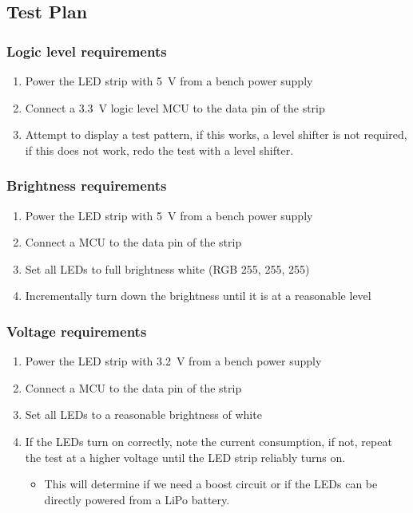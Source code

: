 \documentclass{notes}
\begin{document}
\subsection{Test Plan}
\label{sec:fr1testplan}

\subsubsection{Logic level requirements}
\begin{enumerate}
    \item Power the LED strip with \SI{5}{\volt} from a bench power supply
    \item Connect a \SI{3.3}{\volt} logic level MCU to the data pin of the strip
    \item Attempt to display a test pattern, if this works, a level shifter is not required, if this does not work, redo the test with a level shifter.
\end{enumerate}

\subsubsection{Brightness requirements}
\begin{enumerate}
    \item Power the LED strip with \SI{5}{\volt} from a bench power supply
    \item Connect a MCU to the data pin of the strip
    \item Set all LEDs to full brightness white (RGB 255, 255, 255)
    \item Incrementally turn down the brightness until it is at a reasonable level
\end{enumerate}

\subsubsection{Voltage requirements}
\begin{enumerate}
    \item Power the LED strip with \SI{3.2}{\volt} from a bench power supply
    \item Connect a MCU to the data pin of the strip
    \item Set all LEDs to a reasonable brightness of white
    \item If the LEDs turn on correctly, note the current consumption, if not, repeat the test at a higher voltage until the LED strip reliably turns on.
    \begin{itemize}
        \item This will determine if we need a boost circuit or if the LEDs can be directly powered from a LiPo battery.
    \end{itemize}
\end{enumerate}
\end{document}
